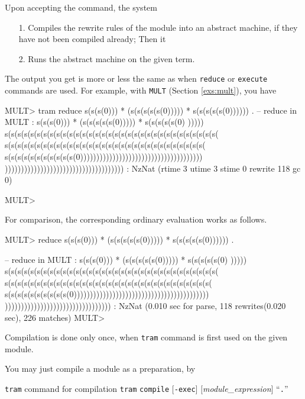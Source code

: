 \documentclass[a4paper]{memoir}
\begin{document}
Upon accepting the command, the system
\begin{itemize}
\item[1.] Compiles the rewrite rules of the module into an abstract
  machine, if they have not been compiled already; Then it
\item[2.] Runs the abstract machine on the given term.
\end{itemize}
The output you get is more or less the same as when \verb|reduce| or
\verb|execute| commands are used. For example, with \verb|MULT|
(Section \ref{exs:mult}), you have
\begin{vvtm}
\begin{ccode}
  MULT> tram reduce s(s(s(0))) * (s(s(s(s(s(0))))) * s(s(s(s(s(0)))))) .
  -- reduce in MULT : s(s(s(0))) * (s(s(s(s(s(0))))) * s(s(s(s(s(0)
      )))))
  s(s(s(s(s(s(s(s(s(s(s(s(s(s(s(s(s(s(s(s(s(s(s(s(s(s(s(s(s(s(s(s(s(
      s(s(s(s(s(s(s(s(s(s(s(s(s(s(s(s(s(s(s(s(s(s(s(s(s(s(s(s(s(s(s(
      s(s(s(s(s(s(s(s(s(s(s(0))))))))))))))))))))))))))))))))))))))
      ))))))))))))))))))))))))))))))))))))) : NzNat
  (rtime 3 utime 3 stime 0 rewrite 118 gc 0)

  MULT> 
\end{ccode}
\end{vvtm}
For comparison, the corresponding ordinary evaluation works as follows.
\begin{vvtm}
\begin{ccode}
  MULT> reduce s(s(s(0))) * (s(s(s(s(s(0))))) * s(s(s(s(s(0)))))) .

  -- reduce in MULT : s(s(s(0))) * (s(s(s(s(s(0))))) * s(s(s(s(s(0)
      )))))
  s(s(s(s(s(s(s(s(s(s(s(s(s(s(s(s(s(s(s(s(s(s(s(s(s(s(s(s(s(s(s(s(s(
    s(s(s(s(s(s(s(s(s(s(s(s(s(s(s(s(s(s(s(s(s(s(s(s(s(s(s(s(s(s(s(s(
    s(s(s(s(s(s(s(s(s(s(0))))))))))))))))))))))))))))))))))))))))))
    ))))))))))))))))))))))))))))))))) : NzNat
  (0.010 sec for parse, 118 rewrites(0.020 sec), 226 matches)
  MULT> 
\end{ccode}
\end{vvtm}
Compilation is done only once, when \verb|tram| command is first used
on the given module.

You may just compile a module as a preparation, by

\begin{bsyntax} \texttt{tram} command for compilation  \Hline
{}
\texttt{tram} \texttt{compile} $[$\texttt{-exec}$]$ $[$\textit{module\_expression}$]$ ``\texttt{.}''
\end{bsyntax}
\end{document}
